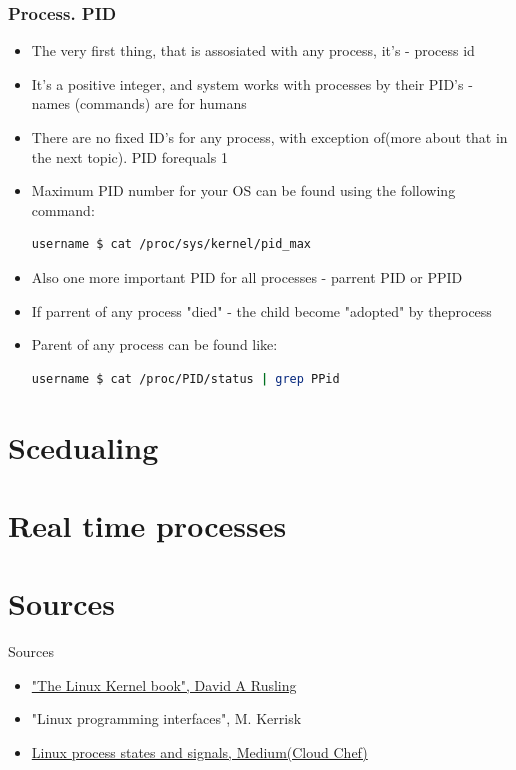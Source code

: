 \documentclass[usenames,dvipsnames,10pt,aspectratio=169]{beamer}
\begin{document}
\begin{frame}[fragile]
    \frametitle{Process. PID}
    \begin{itemize}
        \item The very first thing, that is assosiated with any process, it's - process id 
        \item It's a positive integer, and system works with processes by their PID's - names (commands) are for humans 
        \item There are no fixed ID's for any process, with exception of(more about that in the next topic). PID forequals 1
        \item Maximum PID number for your OS can be found using the following command:
        \begin{lstlisting}[language=Bash, style=shellstyle] 
username $ cat /proc/sys/kernel/pid_max\end{lstlisting}
        \item Also one more important PID for all processes - parrent PID or PPID
        \item If parrent of any process "died" - the child become "adopted" by theprocess
        \item Parent of any process can be found like:
        \begin{lstlisting}[language=Bash, style=shellstyle] 
username $ cat /proc/PID/status | grep PPid \end{lstlisting}
    \end{itemize}
\end{frame}



\section{Scedualing}

\section{Real time processes}

\section{Sources}
\begin{frame}{Sources}
    \begin{itemize}
        \item \href{https://tldp.org/LDP/tlk/tlk-toc.html}{"The Linux Kernel book", David A Rusling}
        \item "Linux programming interfaces", M. Kerrisk
        \item \href{https://cloudchef.medium.com/linux-process-states-and-signals-a967d18fab64}{Linux process states and signals, Medium(Cloud Chef)}
    \end{itemize}
\end{frame}
\end{document}
